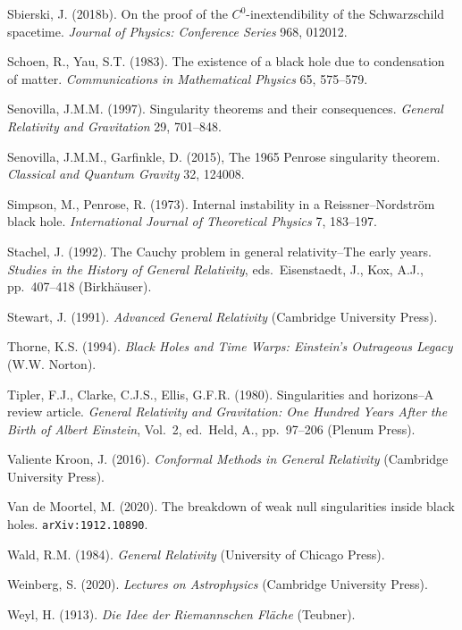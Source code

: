 \documentclass[12pt]{article}
\begin{document}
\begin{small}
\begin{thebibliography}{99}
\item[] Sbierski, J. (2018b). On the proof of the $C^0$-inextendibility of the Schwarzschild spacetime. 
\emph{Journal of Physics: Conference Series} 968, 012012.
            \item[]    Schoen, R., Yau, S.T. (1983). The existence of a black hole due to condensation of matter.
              \emph{Communications in Mathematical Physics} 65, 575--579. 
   \item[] Senovilla, J.M.M.  (1997). Singularity theorems and their consequences.
\emph{General Relativity and Gravitation} 29, 701--848.
\item[] Senovilla, J.M.M.,  Garfinkle, D.  (2015), The 1965 Penrose singularity theorem.
\emph{Classical and Quantum Gravity} 32, 124008.      
\item[] Simpson, M., Penrose, R. (1973). Internal instability in a Reissner--Nordstr\"{o}m black hole.
\emph{International Journal of Theoretical Physics} 7, 183--197. 
   \item[]   Stachel, J. (1992). The Cauchy problem in general relativity--The early years.   
   \emph{Studies in the History of General Relativity}, eds.\   Eisenstaedt, J.,  Kox, A.J., 
   pp.\ 407--418 (Birkh\"{a}user). 
             \item[]  Stewart, J. (1991). \emph{Advanced General Relativity} (Cambridge University Press). 
            \item[]   Thorne, K.S. (1994). \emph{Black Holes and Time Warps: Einstein's Outrageous Legacy} (W.W. Norton).
            \item[] Tipler, F.J., Clarke, C.J.S., Ellis, G.F.R. (1980). Singularities and horizons--A review article.
 \emph{General Relativity and Gravitation: One Hundred Years After the Birth of Albert Einstein}, Vol.\ 2, ed.\
 Held, A., pp.\ 97--206 (Plenum Press). 
  \item[] Valiente Kroon, J. (2016). \emph{Conformal Methods in General Relativity} (Cambridge University Press). 
  \item[] Van de Moortel, M. (2020). The breakdown of weak null singularities inside black holes. \texttt{arXiv:1912.10890}.
  \item[]  Wald, R.M. (1984). \emph{General Relativity} (University of Chicago Press). 
  \item[]  Weinberg, S. (2020). \emph{Lectures on Astrophysics} (Cambridge University Press). 
    \item[] Weyl, H. (1913). \emph{Die Idee der Riemannschen Fl\"{a}che} (Teubner).   

\end{thebibliography}
\end{small}
\end{document}
